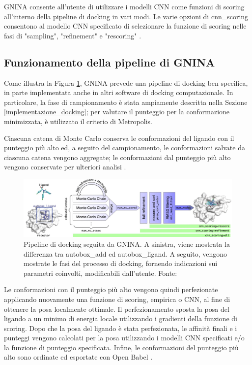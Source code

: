 GNINA consente all'utente di utilizzare i modelli CNN come funzioni di scoring all'interno della pipeline di docking in vari modi. Le varie opzioni di cnn\_scoring consentono al modello CNN specificato di selezionare la funzione di scoring nelle fasi di "sampling", "refinement" e "rescoring" \cite{mcnutt_gnina_2021}. 


\subsection{Funzionamento della pipeline di GNINA}
Come illustra la Figura \ref{fig:gnina_pipeline}, GNINA prevede una pipeline di docking ben specifica, in parte implementata anche in altri software di docking computazionale. In particolare, la fase di campionamento è stata ampiamente descritta nella Sezione \ref{implementazione_docking};  per valutare il punteggio per la conformazione minimizzata, è utilizzato il criterio di Metropolis.

Ciascuna catena di Monte Carlo conserva le conformazioni del ligando con il punteggio più alto ed, a seguito del campionamento, le conformazioni salvate da ciascuna catena vengono aggregate; le conformazioni dal punteggio più alto vengono conservate per ulteriori analisi \cite{mcnutt_gnina_2021}. 

\vspace{0.5cm}
\begin{figure}[H]
    \centering
    \includegraphics[scale=0.35]{images/chapter2/gnina_pipeline.jpg}
    \caption[Pipeline di docking seguita da GNINA.]{Pipeline di docking seguita da GNINA. A sinistra, viene mostrata la differenza tra autobox\_add ed autobox\_ligand. A seguito, vengono mostrate le fasi del processo di docking, fornendo indicazioni sui parametri coinvolti, modificabili dall'utente. Fonte: \cite{mcnutt_gnina_2021}}
    \label{fig:gnina_pipeline}
\end{figure}

Le conformazioni con il punteggio più alto vengono quindi perfezionate applicando nuovamente una funzione di scoring, empirica o CNN, al fine di ottenere la posa localmente ottimale.
Il perfezionamento sposta la posa del ligando a un minimo di energia locale utilizzando i gradienti della funzione di scoring. Dopo che la posa del ligando è stata perfezionata, le affinità finali e i punteggi vengono calcolati per la posa utilizzando i modelli CNN specificati e/o la funzione di punteggio specificata. Infine, le conformazioni del punteggio più alto sono ordinate ed esportate con Open Babel \cite{mcnutt_gnina_2021}. 


